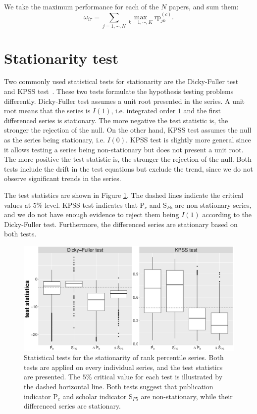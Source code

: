 \begin{refsection}
We take the maximum performance for each of the $N$ papers, and sum them:
\begin{equation}
    \omega_{i \tau} = \sum_{j=1,\cdots,N} \max_{k=1,\cdots, K} \text{rp}_{j k} ^{(c)}.
\end{equation}
\fi

\section{Stationarity test}
\label{sec:suppl_stationarity}

Two commonly used statistical tests for stationarity are the Dicky-Fuller test~\cite{dickey1979distribution} and KPSS test~\cite{kwiatkowski1992testing}. These two tests formulate the hypothesis testing problems differently. Dicky-Fuller test assumes a unit root presented in the series. A unit root means that the series is $I(1)$, i.e. integrated order $1$ and the first differenced series is stationary. The more negative the test statistic is, the stronger the rejection of the null. On the other hand, KPSS test assumes the null as the series being stationary, i.e. $I(0)$. KPSS test is slightly more general since it allows testing a series being non-stationary but does not present a unit root. The more positive the test statistic is, the stronger the rejection of the null. Both tests include the drift in the test equations but exclude the trend, since we do not observe significant trends in the series. 

The test statistics are shown in Figure \ref{fig:stationarity_test}. The dashed lines indicate the critical values at $5 \%$ level. KPSS test indicates that P$_c$ and S$_{P5}$ are non-stationary series, and we do not have enough evidence to reject them being $I(1)$ according to the Dicky-Fuller test. Furthermore, the differenced series are stationary based on both tests.


\begin{figure}[ht!]
    \centering
    \includegraphics[width=\textwidth]{figures/stationarity/df_kpss.eps}
    \caption[Stationarity test of rank percentile series]{Statistical tests for the stationarity of rank percentile series. Both tests are applied on every individual series, and the test statistics are presented. The $5\%$ critical value for each test is illustrated by the dashed horizontal line. Both tests suggest that publication indicator P$_c$ and scholar indicator S$_{P5}$ are non-stationary, while their differenced series are stationary. }
    \label{fig:stationarity_test}
\end{figure}


\end{refsection}
